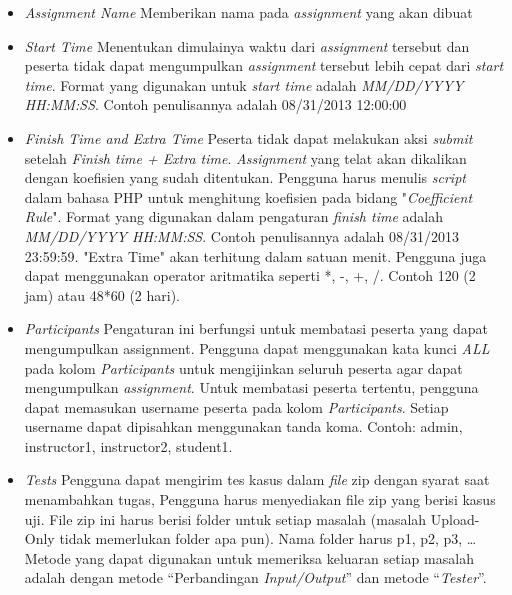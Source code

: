 \begin{itemize}
    \item \textit{Assignment Name}\newline
    Memberikan nama pada \textit{assignment} yang akan dibuat \\
    \item \textit{Start Time}\newline
    Menentukan dimulainya waktu dari \textit{assignment} tersebut dan peserta tidak dapat mengumpulkan \textit{assignment} tersebut lebih cepat dari \textit{start time}. Format yang digunakan untuk \textit{start time} adalah \textit{MM/DD/YYYY HH:MM:SS}. Contoh penulisannya adalah 08/31/2013 12:00:00 \\
    \item \textit{Finish Time and Extra Time}\newline
    Peserta tidak dapat melakukan aksi \textit{submit} setelah \textit{Finish time + Extra time}. \textit{Assignment} yang telat akan dikalikan dengan koefisien yang sudah ditentukan. Pengguna harus menulis \textit{script} dalam bahasa PHP untuk menghitung koefisien pada bidang "\textit{Coefficient Rule}". Format yang digunakan dalam pengaturan \textit{finish time} adalah \textit{MM/DD/YYYY HH:MM:SS}. Contoh penulisannya adalah 08/31/2013 23:59:59. "Extra Time" akan terhitung dalam satuan menit. Pengguna juga dapat menggunakan operator aritmatika seperti *, -, +, /. Contoh 120 (2 jam) atau 48*60 (2 hari).\\
    \item \textit{Participants} \newline
    Pengaturan ini berfungsi untuk membatasi peserta yang dapat mengumpulkan assignment. Pengguna dapat menggunakan kata kunci \textit{ALL} pada kolom \textit{Participants} untuk mengijinkan seluruh peserta agar dapat mengumpulkan \textit{assignment}. Untuk membatasi peserta tertentu, pengguna dapat memasukan username peserta pada kolom \textit{Participants}. Setiap username dapat dipisahkan menggunakan tanda koma. Contoh: admin, instructor1, instructor2, student1.\\
    \item \textit{Tests}\newline
    Pengguna dapat mengirim tes kasus dalam \textit{file} zip dengan syarat saat menambahkan tugas, Pengguna harus menyediakan file zip yang berisi kasus uji. File zip ini harus berisi folder untuk setiap masalah (masalah Upload-Only tidak memerlukan folder apa pun). Nama folder harus p1, p2, p3, \ldots Metode yang dapat digunakan untuk memeriksa keluaran setiap masalah adalah dengan metode “Perbandingan \textit{Input/Output}” dan metode “\textit{Tester}”.

\end{itemize}
